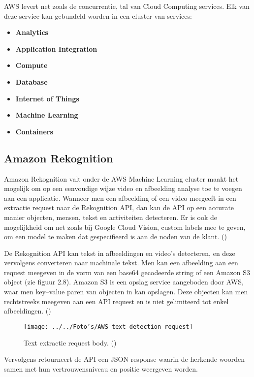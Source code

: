 AWS levert net zoals de concurrentie, tal van Cloud Computing services. Elk van deze service kan gebundeld worden in een cluster van services: 


\begin{itemize}
	\item \textbf{Analytics}
	\item \textbf{Application Integration}
	\item \textbf{Compute}
	\item \textbf{Database}
	\item \textbf{Internet of Things}
	\item \textbf{Machine Learning}
	\item \textbf{Containers}
\end{itemize}


\subsection{Amazon Rekognition}
Amazon Rekognition valt onder de AWS Machine Learning cluster maakt het mogelijk om op een eenvoudige wijze video en afbeelding analyse toe te voegen aan een applicatie. Wanneer men een afbeelding of een video meegeeft in een extractie request naar de Rekognition API, dan kan de API op een accurate manier objecten, mensen, tekst en activiteiten detecteren. Er is ook de mogelijkheid om net zoals bij Google Cloud Vision, custom labels mee te geven, om een model te maken dat gespecifieerd is aan de noden van de klant. (\cite{Amazon2020b})


De Rekognition API kan tekst in afbeeldingen en video's detecteren, en deze vervolgens converteren naar machinale tekst. Men kan een afbeelding aan een request meegeven in de vorm van een base64 gecodeerde string of een Amazon S3 object (zie figuur 2.8). Amazon S3 is een opslag service aangeboden door AWS, waar men key–value paren van objecten in kan opslagen. Deze objecten kan men rechtstreeks meegeven aan een API request en is niet gelimiteerd tot enkel afbeeldingen. (\cite{Amazon2019})

\begin{figure}[h]
	\texttt{[image: ../../Foto's/AWS text detection request]}
	\captionsetup{justification=centering,margin=2cm}
	\caption{Text extractie request body. (\cite{Amazon2019})}
	\centering
\end{figure}



Vervolgens retourneert de API een JSON response waarin de herkende woorden samen met hun vertrouwensniveau en positie weergeven worden. 

